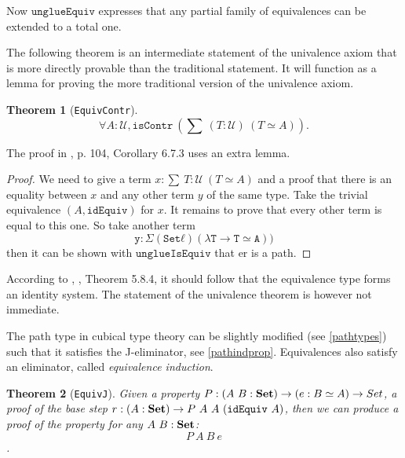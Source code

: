 \documentclass[12pt,a4paper,twoside,xetex,draft]{book}
\newcommand{\keyword}[1]{\emph{#1}\index{#1}}
\newtheorem{theorem}{Theorem}[section]
\newcommand{\op}[1]{\mathtt{#1}}
\newcommand{\type}{\mathcal{U}}
\begin{document}
Now $\op{unglueEquiv}$  expresses that any partial family of equivalences can be extended to a total one.

The following theorem is an intermediate statement of the univalence axiom that is more directly provable than the traditional statement. It will function as a lemma for proving the more traditional version of the univalence axiom.

\begin{theorem}[\texttt{EquivContr}]\label{contrSingl}
 $$\forall A : \type, \op{isContr} \ \left( \sum \ (T : \type) \  \left( T \simeq A \right) \right).$$ 
\end{theorem}


The proof in \cite{Huber2016}, p. 104, Corollary 6.7.3 uses an extra lemma.

\begin{proof}
We need to give a term $x : \sum \ T : \type \  \left( T \simeq A \right)$ and a proof that there is an equality between $x$ and any other term $y$ of the same type. Take the trivial equivalence  $(A, \op{idEquiv})$ for $x$. It remains to prove that every other term is equal to this one. So take another term $$\op{y : Σ (Set ℓ) (λ T → T ≃ A))}$$ then it can be shown with $\op{unglueIsEquiv}$ that er is a path.
\end{proof}


According to \cite{Huber2016}, \cite{Voevodsky2013}, Theorem 5.8.4, it should follow that the equivalence type forms an identity system. The statement of the univalence theorem is however not immediate.

The path type in cubical type theory can be slightly modified (see \cref{pathtypes}) such that it satisfies the J-eliminator, see \cref{pathindprop}. Equivalences also satisfy an eliminator, called \keyword{equivalence induction}. 

\begin{theorem}[\texttt{EquivJ}]
Given a property $P: (A \ B : \text{\textbf{Set}}) \rightarrow (e : B \simeq A) \rightarrow Set$, a proof of the base step $r : (A : \set) \rightarrow P \ A\ A \ (\texttt{idEquiv} \ A)$, then we can produce a proof of the property for any $A \ B: \text{\textbf{Set}}$: $$ P\  A \ B\ e$$.
\end{theorem}
\end{document}
